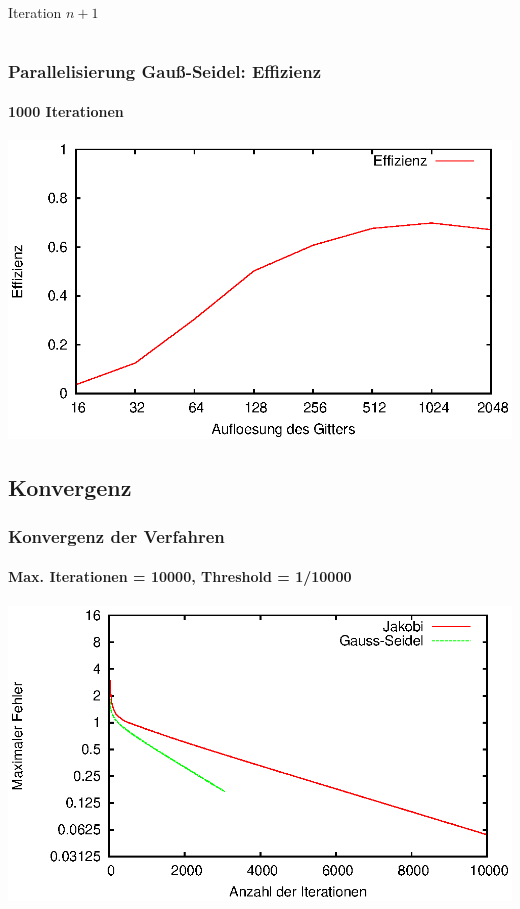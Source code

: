 \documentclass{beamer}
\begin{document}
\begin{frame}
\begin{columns}
\begin{column}{0.5\textwidth}
            \begin{center}
                Iteration $n+1$
            \end{center}
        \end{column}
    \end{columns}
\end{frame}

\begin{frame}
    \frametitle{Parallelisierung Gauß-Seidel: Effizienz}
    \framesubtitle{1000 Iterationen}
    \includegraphics[width=\textwidth]{plots/effizienzgaussseidel}
\end{frame}

\subsection{Konvergenz}
\begin{frame}
    \frametitle{Konvergenz der Verfahren}
    \framesubtitle{Max. Iterationen = 10000, Threshold = 1/10000}
    \includegraphics[width=\textwidth]{plots/fehlerpres}
\end{frame}
\end{document}
